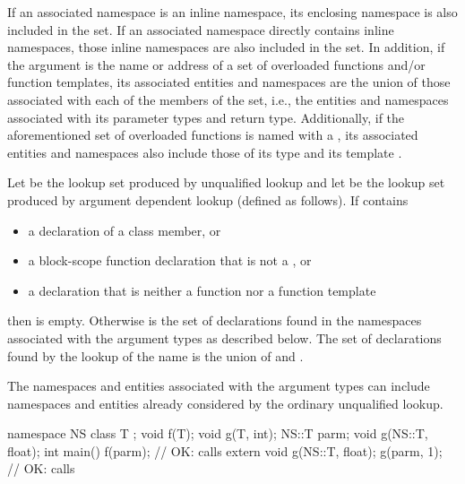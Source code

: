 If an associated namespace is an inline namespace, its
enclosing namespace is also included in the set. If an associated namespace
directly contains inline namespaces, those inline namespaces are also included
in the set.
In addition, if the argument is the name or address of a set of
overloaded functions and/or function templates, its associated entities
and namespaces are the union of those associated with each of the
members of the set, i.e., the entities and namespaces associated with its
parameter types and return type.
Additionally, if the aforementioned set of overloaded functions is named with
a , its associated entities and namespaces also include
those of its type  and its template
.

\pnum
Let  be the lookup set produced by unqualified
lookup and let  be the lookup set produced
by argument dependent lookup (defined as follows). If  contains
\begin{itemize}
\item a declaration of a class member, or
\item a block-scope function declaration that is not a , or
\item a declaration that is neither a function nor a function template
\end{itemize}
then  is empty. Otherwise  is the set of declarations
found in the namespaces associated with the argument types as described
below. The set of declarations found by the lookup of the name is the
union of  and . \begin{note} The namespaces and entities
associated with the argument types can include namespaces and entities
already considered by the ordinary unqualified lookup. \end{note}
\begin{example}

\begin{codeblock}
namespace NS {
  class T { };
  void f(T);
  void g(T, int);
}
NS::T parm;
void g(NS::T, float);
int main() {
  f(parm);                      // OK: calls 
  extern void g(NS::T, float);
  g(parm, 1);                   // OK: calls 
}
\end{codeblock}
\end{example}

